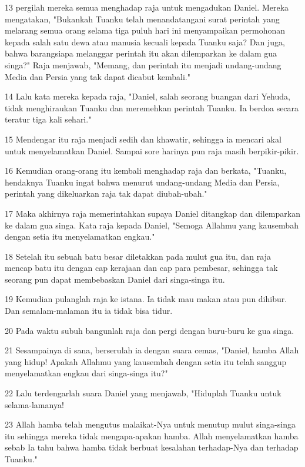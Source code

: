 \par 13 pergilah mereka semua menghadap raja untuk mengadukan Daniel. Mereka mengatakan, "Bukankah Tuanku telah menandatangani surat perintah yang melarang semua orang selama tiga puluh hari ini menyampaikan permohonan kepada salah satu dewa atau manusia kecuali kepada Tuanku saja? Dan juga, bahwa barangsiapa melanggar perintah itu akan dilemparkan ke dalam gua singa?" Raja menjawab, "Memang, dan perintah itu menjadi undang-undang Media dan Persia yang tak dapat dicabut kembali."
\par 14 Lalu kata mereka kepada raja, "Daniel, salah seorang buangan dari Yehuda, tidak menghiraukan Tuanku dan meremehkan perintah Tuanku. Ia berdoa secara teratur tiga kali sehari."
\par 15 Mendengar itu raja menjadi sedih dan khawatir, sehingga ia mencari akal untuk menyelamatkan Daniel. Sampai sore harinya pun raja masih berpikir-pikir.
\par 16 Kemudian orang-orang itu kembali menghadap raja dan berkata, "Tuanku, hendaknya Tuanku ingat bahwa menurut undang-undang Media dan Persia, perintah yang dikeluarkan raja tak dapat diubah-ubah."
\par 17 Maka akhirnya raja memerintahkan supaya Daniel ditangkap dan dilemparkan ke dalam gua singa. Kata raja kepada Daniel, "Semoga Allahmu yang kausembah dengan setia itu menyelamatkan engkau."
\par 18 Setelah itu sebuah batu besar diletakkan pada mulut gua itu, dan raja mencap batu itu dengan cap kerajaan dan cap para pembesar, sehingga tak seorang pun dapat membebaskan Daniel dari singa-singa itu.
\par 19 Kemudian pulanglah raja ke istana. Ia tidak mau makan atau pun dihibur. Dan semalam-malaman itu ia tidak bisa tidur.
\par 20 Pada waktu subuh bangunlah raja dan pergi dengan buru-buru ke gua singa.
\par 21 Sesampainya di sana, berserulah ia dengan suara cemas, "Daniel, hamba Allah yang hidup! Apakah Allahmu yang kausembah dengan setia itu telah sanggup menyelamatkan engkau dari singa-singa itu?"
\par 22 Lalu terdengarlah suara Daniel yang menjawab, "Hiduplah Tuanku untuk selama-lamanya!
\par 23 Allah hamba telah mengutus malaikat-Nya untuk menutup mulut singa-singa itu sehingga mereka tidak mengapa-apakan hamba. Allah menyelamatkan hamba sebab Ia tahu bahwa hamba tidak berbuat kesalahan terhadap-Nya dan terhadap Tuanku."
